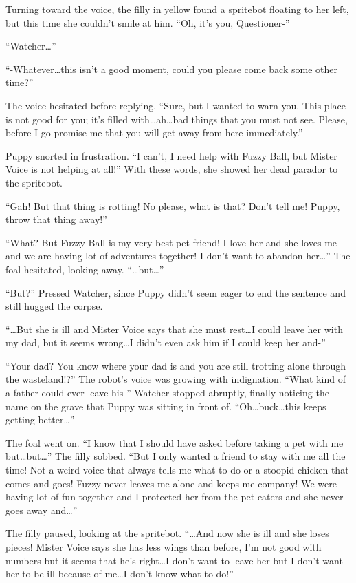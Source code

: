 Turning toward the voice, the filly in yellow found a spritebot floating to her left, but this time she couldn't smile at him. ``Oh, it's you, Questioner-''

``Watcher\dots''

``-Whatever\dots this isn't a good moment, could you please come back some other time?''

The voice hesitated before replying. ``Sure, but I wanted to warn you. This place is not good for you; it's filled with\dots ah\dots bad things that you must not see. Please, before I go promise me that you will get away from here immediately.''

Puppy snorted in frustration. ``I can't, I need help with Fuzzy Ball, but Mister Voice is not helping at all!'' With these words, she showed her dead parador to the spritebot.

``Gah! But that thing is rotting! No please, what is that? Don't tell me! Puppy, throw that thing away!''

``What? But Fuzzy Ball is my very best pet friend! I love her and she loves me and we are having lot of adventures together! I don't want to abandon her\dots'' The foal hesitated, looking away. ``\dots but\dots''

``But?'' Pressed Watcher, since Puppy didn't seem eager to end the sentence and still hugged the corpse.

``\dots But she is ill and Mister Voice says that she must rest\dots I could leave her with my dad, but it seems wrong\dots I didn't even ask him if I could keep her and-''

``Your dad? You know where your dad is and you are still trotting alone through the wasteland!?'' The robot's voice was growing with indignation. ``What kind of a father could ever leave his-'' Watcher stopped abruptly, finally noticing the name on the grave that Puppy was sitting in front of. ``Oh\dots buck\dots this keeps getting better\dots''

The foal went on. ``I know that I should have asked before taking a pet with me but\dots but\dots'' The filly sobbed. ``But I only wanted a friend to stay with me all the time! Not a weird voice that always tells me what to do or a stoopid chicken that comes and goes! Fuzzy never leaves me alone and keeps me company! We were having lot of fun together and I protected her from the pet eaters and she never goes away and\dots''

The filly paused, looking at the spritebot. ``\dots And now she is ill and she loses pieces! Mister Voice says she has less wings than before, I'm not good with numbers but it seems that he's right\dots I don't want to leave her but I don't want her to be ill because of me\dots I don't know what to do!''

